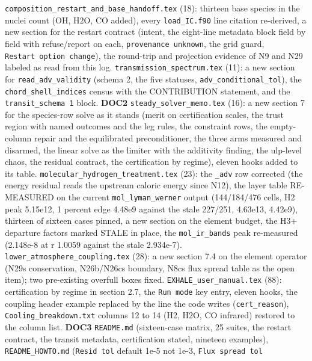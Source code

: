 \documentclass[english,a4paper]{my_memo}
\begin{document}
\begin{itemize}
  \texttt{composition\_restart\_and\_base\_handoff.tex} (18): thirteen base species in
  the nuclei count (OH, H2O, CO added), every \texttt{load\_IC.f90} line citation
  re-derived, a new section for the restart contract (intent, the eight-line
  metadata block field by field with refuse/report on each, \texttt{provenance\ unknown}, the grid guard, \texttt{Restart\ option\ change}), the round-trip and
  projection evidence of N9 and N29 labeled as read from this log.
  \texttt{transmission\_spectrum.tex} (11): a new section for \texttt{read\_adv\_validity}
  (schema 2, the five statuses, \texttt{adv\_conditional\_tol}), the
  \texttt{chord\_shell\_indices} census with the CONTRIBUTION statement, and the
  \texttt{transit\_schema\ 1} block. \textbf{DOC2} \texttt{steady\_solver\_memo.tex} (16): a new
  section 7 for the species-row solve as it stands (merit on certification
  scales, the trust region with named outcomes and the leg rules, the
  constraint rows, the empty-column repair and the equilibrated
  preconditioner, the three arms measured and disarmed, the linear solve as
  the limiter with the additivity finding, the ulp-level chaos, the residual
  contract, the certification by regime), eleven hooks added to its table.
  \texttt{molecular\_hydrogen\_treatment.tex} (23): the \texttt{\_adv} row corrected (the
  energy residual reads the upstream caloric energy since N12), the layer
  table RE-MEASURED on the current \texttt{mol\_lyman\_werner} output (144/184/476
  cells, H2 peak 5.15e12, 1 percent edge 4.48e9 against the stale 227/251,
  4.63e13, 4.42e9), thirteen of sixteen cases pinned, a new section on the
  element budget, the H3+ departure factors marked STALE in place, the
  \texttt{mol\_ir\_bands} peak re-measured (2.148e-8 at r 1.0059 against the stale
  2.934e-7). \texttt{lower\_atmosphere\_coupling.tex} (28): a new section 7.4 on the
  element operator (N29\textquotesingle s conservation, N26b/N26c\textquotesingle s boundary, N8c\textquotesingle s flux
  spread table as the open item); two pre-existing overfull boxes fixed.
  \texttt{EXHALE\_user\_manual.tex} (88): certification by regime in section 2.7, the
  \texttt{Run\ mode} key entry, eleven hooks, the coupling header example replaced by
  the line the code writes (\texttt{cert\_reason}), \texttt{Cooling\_breakdown.txt} columns
  12 to 14 (H2, H2O, CO infrared) restored to the column list. \textbf{DOC3}
  \texttt{README.md} (sixteen-case matrix, 25 suites, the restart contract, the
  transit metadata, certification stated, nineteen examples),
  \texttt{README\_HOWTO.md} (\texttt{Resid\ tol} default 1e-5 not 1e-3, \texttt{Flux\ spread\ tol}

\end{itemize}
\end{document}
